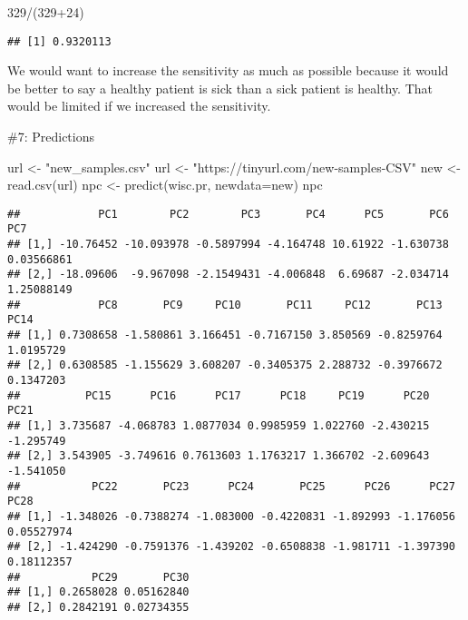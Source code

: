 \documentclass[
]{article}
\newenvironment{Shaded}{\begin{snugshade}}{\end{snugshade}}
\newcommand{\AttributeTok}[1]{\textcolor[rgb]{0.77,0.63,0.00}{#1}}
\newcommand{\DecValTok}[1]{\textcolor[rgb]{0.00,0.00,0.81}{#1}}
\newcommand{\FunctionTok}[1]{\textcolor[rgb]{0.00,0.00,0.00}{#1}}
\newcommand{\NormalTok}[1]{#1}
\newcommand{\OtherTok}[1]{\textcolor[rgb]{0.56,0.35,0.01}{#1}}
\newcommand{\SpecialCharTok}[1]{\textcolor[rgb]{0.00,0.00,0.00}{#1}}
\newcommand{\StringTok}[1]{\textcolor[rgb]{0.31,0.60,0.02}{#1}}
\begin{document}
\begin{Shaded}
\begin{Highlighting}[]
\DecValTok{329}\SpecialCharTok{/}\NormalTok{(}\DecValTok{329}\SpecialCharTok{+}\DecValTok{24}\NormalTok{)}
\end{Highlighting}
\end{Shaded}

\begin{verbatim}
## [1] 0.9320113
\end{verbatim}

We would want to increase the sensitivity as much as possible because it
would be better to say a healthy patient is sick than a sick patient is
healthy. That would be limited if we increased the sensitivity.

\#7: Predictions

\begin{Shaded}
\begin{Highlighting}[]
\NormalTok{url }\OtherTok{\textless{}{-}} \StringTok{"new\_samples.csv"}
\NormalTok{url }\OtherTok{\textless{}{-}} \StringTok{"https://tinyurl.com/new{-}samples{-}CSV"}
\NormalTok{new }\OtherTok{\textless{}{-}} \FunctionTok{read.csv}\NormalTok{(url)}
\NormalTok{npc }\OtherTok{\textless{}{-}} \FunctionTok{predict}\NormalTok{(wisc.pr, }\AttributeTok{newdata=}\NormalTok{new)}
\NormalTok{npc}
\end{Highlighting}
\end{Shaded}

\begin{verbatim}
##            PC1        PC2        PC3       PC4      PC5       PC6        PC7
## [1,] -10.76452 -10.093978 -0.5897994 -4.164748 10.61922 -1.630738 0.03566861
## [2,] -18.09606  -9.967098 -2.1549431 -4.006848  6.69687 -2.034714 1.25088149
##            PC8       PC9     PC10       PC11     PC12       PC13      PC14
## [1,] 0.7308658 -1.580861 3.166451 -0.7167150 3.850569 -0.8259764 1.0195729
## [2,] 0.6308585 -1.155629 3.608207 -0.3405375 2.288732 -0.3976672 0.1347203
##          PC15      PC16      PC17      PC18     PC19      PC20      PC21
## [1,] 3.735687 -4.068783 1.0877034 0.9985959 1.022760 -2.430215 -1.295749
## [2,] 3.543905 -3.749616 0.7613603 1.1763217 1.366702 -2.609643 -1.541050
##           PC22       PC23      PC24       PC25      PC26      PC27       PC28
## [1,] -1.348026 -0.7388274 -1.083000 -0.4220831 -1.892993 -1.176056 0.05527974
## [2,] -1.424290 -0.7591376 -1.439202 -0.6508838 -1.981711 -1.397390 0.18112357
##           PC29       PC30
## [1,] 0.2658028 0.05162840
## [2,] 0.2842191 0.02734355
\end{verbatim}
\end{document}
